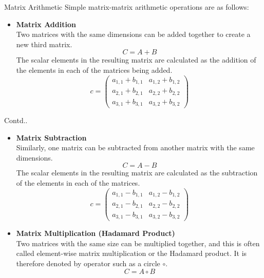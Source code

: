 \documentclass{beamer}
\begin{document}
\begin{frame}
\begin{block}{Matrix Arithmetic}
Simple matrix-matrix arithmetic operations are as follows:
\begin{itemize}
    \item \textbf{Matrix Addition}\\
    Two matrices with the same dimensions can be added together to create a new third matrix.
    	\begin{equation*}
    	C = A + B
    	\end{equation*}
    The scalar elements in the resulting matrix are calculated as the addition of the elements in each of the matrices being added.
    	\begin{equation*}
    		c = \begin{pmatrix}
    				a_{1,1}+b_{1,1}  & a_{1,2}+b_{1,2} \\
    				a_{2,1}+b_{2,1}  & a_{2,2}+b_{2,2} \\
    				a_{3,1}+b_{3,1}  & a_{3,2}+b_{3,2} 
    			\end{pmatrix}
    	\end{equation*}
\end{itemize}
\end{block}
\end{frame}

\begin{frame}
\begin{block}{Contd..}
\begin{itemize}
    \item \textbf{Matrix Subtraction}\\
    Similarly, one matrix can be subtracted from another matrix with the same dimensions.
    	\begin{equation*}
    	C = A - B
    	\end{equation*}
		The scalar elements in the resulting matrix are calculated as the subtraction of the elements in each of the matrices.
    	\begin{equation*}
    		c = \begin{pmatrix}
    				a_{1,1}-b_{1,1}  & a_{1,2}-b_{1,2} \\
    				a_{2,1}-b_{2,1}  & a_{2,2}-b_{2,2} \\
    				a_{3,1}-b_{3,1}  & a_{3,2}-b_{3,2} 
    			\end{pmatrix}
    	\end{equation*}
    
    \item \textbf{Matrix Multiplication (Hadamard Product)}\\
	Two matrices with the same size can be multiplied together, and this is often called element-wise matrix multiplication or the Hadamard product. It is therefore denoted by operator such as a circle $\circ$.
    	\begin{equation*}
    	C = A \circ B
    	\end{equation*}
\end{itemize}
\end{block}
\end{frame}
\end{document}

